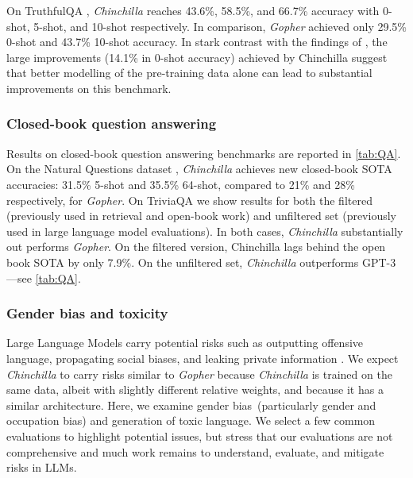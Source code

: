 On TruthfulQA \citep{truthfulqa}, \textit{Chinchilla} reaches 43.6\%, 58.5\%, and 66.7\% accuracy with 0-shot, 5-shot, and 10-shot respectively. In comparison, \textit{Gopher} achieved only 29.5\% 0-shot and 43.7\% 10-shot accuracy. In stark contrast with the findings of \citet{truthfulqa}, the large improvements (14.1\% in 0-shot accuracy) achieved by Chinchilla suggest that better modelling of the pre-training data alone can lead to substantial improvements on this benchmark.

\subsubsection{Closed-book question answering} Results on closed-book question answering benchmarks are reported in \autoref{tab:QA}.
On the Natural Questions dataset \citep{naturalquestions}, \textit{Chinchilla} achieves new closed-book SOTA accuracies: 31.5\% 5-shot and 35.5\% 64-shot, compared to 21\% and 28\% respectively, for \textit{Gopher}.
On TriviaQA \citep{triviaqa} we show results for both the filtered (previously used in retrieval and open-book work) and unfiltered set (previously used in large language model evaluations). In both cases, \textit{Chinchilla} substantially out performs \textit{Gopher}.
On the filtered version, Chinchilla lags behind the open book SOTA \citep{izacard2020distilling} by only 7.9\%.
On the unfiltered set, \textit{Chinchilla} outperforms GPT-3---see \autoref{tab:QA}.

\subsubsection{Gender bias and toxicity} Large Language Models carry potential risks such as outputting offensive language, propagating social biases, and leaking private information \citep{weidinger2021harms,bender2021dangers}. We expect \textit{Chinchilla} to carry risks similar to \textit{Gopher} because \textit{Chinchilla} is trained on the same data, albeit with slightly different relative weights, and because it has a similar architecture. Here, we examine gender bias~(particularly gender and occupation bias) and generation of toxic language. We select a few common evaluations to highlight potential issues, but stress that our evaluations are not comprehensive and much work remains to understand, evaluate, and mitigate risks in LLMs. 

